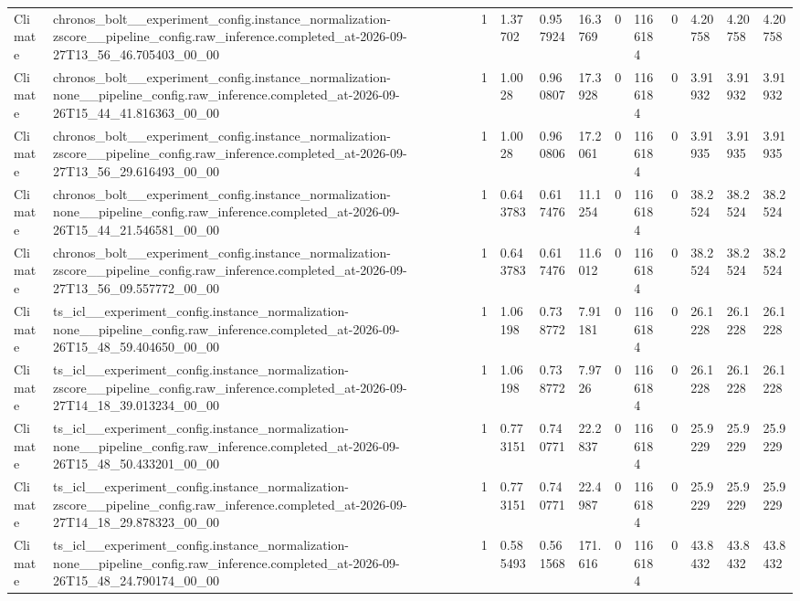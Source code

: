 \begin{tabular}{llllllllllll}
Climate & chronos\_bolt\_\_experiment\_config.instance\_normalization-zscore\_\_pipeline\_config.raw\_inference.completed\_at-2026-09-27T13\_56\_46.705403\_00\_00 & 1 & 1.37702 & 0.957924 & 16.3769 & 0 & 1166184 & 0 & 4.20758 & 4.20758 & 4.20758 \\
Climate & chronos\_bolt\_\_experiment\_config.instance\_normalization-none\_\_pipeline\_config.raw\_inference.completed\_at-2026-09-26T15\_44\_41.816363\_00\_00 & 1 & 1.0028 & 0.960807 & 17.3928 & 0 & 1166184 & 0 & 3.91932 & 3.91932 & 3.91932 \\
Climate & chronos\_bolt\_\_experiment\_config.instance\_normalization-zscore\_\_pipeline\_config.raw\_inference.completed\_at-2026-09-27T13\_56\_29.616493\_00\_00 & 1 & 1.0028 & 0.960806 & 17.2061 & 0 & 1166184 & 0 & 3.91935 & 3.91935 & 3.91935 \\
Climate & chronos\_bolt\_\_experiment\_config.instance\_normalization-none\_\_pipeline\_config.raw\_inference.completed\_at-2026-09-26T15\_44\_21.546581\_00\_00 & 1 & 0.643783 & 0.617476 & 11.1254 & 0 & 1166184 & 0 & 38.2524 & 38.2524 & 38.2524 \\
Climate & chronos\_bolt\_\_experiment\_config.instance\_normalization-zscore\_\_pipeline\_config.raw\_inference.completed\_at-2026-09-27T13\_56\_09.557772\_00\_00 & 1 & 0.643783 & 0.617476 & 11.6012 & 0 & 1166184 & 0 & 38.2524 & 38.2524 & 38.2524 \\
Climate & ts\_icl\_\_experiment\_config.instance\_normalization-none\_\_pipeline\_config.raw\_inference.completed\_at-2026-09-26T15\_48\_59.404650\_00\_00 & 1 & 1.06198 & 0.738772 & 7.91181 & 0 & 1166184 & 0 & 26.1228 & 26.1228 & 26.1228 \\
Climate & ts\_icl\_\_experiment\_config.instance\_normalization-zscore\_\_pipeline\_config.raw\_inference.completed\_at-2026-09-27T14\_18\_39.013234\_00\_00 & 1 & 1.06198 & 0.738772 & 7.9726 & 0 & 1166184 & 0 & 26.1228 & 26.1228 & 26.1228 \\
Climate & ts\_icl\_\_experiment\_config.instance\_normalization-none\_\_pipeline\_config.raw\_inference.completed\_at-2026-09-26T15\_48\_50.433201\_00\_00 & 1 & 0.773151 & 0.740771 & 22.2837 & 0 & 1166184 & 0 & 25.9229 & 25.9229 & 25.9229 \\
Climate & ts\_icl\_\_experiment\_config.instance\_normalization-zscore\_\_pipeline\_config.raw\_inference.completed\_at-2026-09-27T14\_18\_29.878323\_00\_00 & 1 & 0.773151 & 0.740771 & 22.4987 & 0 & 1166184 & 0 & 25.9229 & 25.9229 & 25.9229 \\
Climate & ts\_icl\_\_experiment\_config.instance\_normalization-none\_\_pipeline\_config.raw\_inference.completed\_at-2026-09-26T15\_48\_24.790174\_00\_00 & 1 & 0.585493 & 0.561568 & 171.616 & 0 & 1166184 & 0 & 43.8432 & 43.8432 & 43.8432 \\

\end{tabular}
